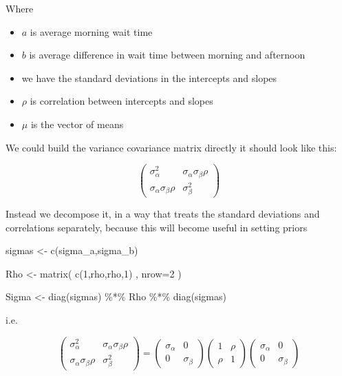 \documentclass[
]{book}
\newenvironment{Shaded}{\begin{snugshade}}{\end{snugshade}}
\newcommand{\AttributeTok}[1]{\textcolor[rgb]{0.77,0.63,0.00}{#1}}
\newcommand{\DecValTok}[1]{\textcolor[rgb]{0.00,0.00,0.81}{#1}}
\newcommand{\FunctionTok}[1]{\textcolor[rgb]{0.00,0.00,0.00}{#1}}
\newcommand{\NormalTok}[1]{#1}
\newcommand{\OtherTok}[1]{\textcolor[rgb]{0.56,0.35,0.01}{#1}}
\newcommand{\SpecialCharTok}[1]{\textcolor[rgb]{0.00,0.00,0.00}{#1}}
\providecommand{\tightlist}{%
  \setlength{\itemsep}{0pt}\setlength{\parskip}{0pt}}
\begin{document}
Where

\begin{itemize}
\tightlist
\item
  \(a\) is average morning wait time
\item
  \(b\) is average difference in wait time between morning and afternoon
\item
  we have the standard deviations in the intercepts and slopes
\item
  \(\rho\) is correlation between intercepts and slopes
\item
  \(\mu\) is the vector of means
\end{itemize}

We could build the variance covariance matrix directly it should look like this:

\[
\begin{pmatrix}
\sigma_\alpha^2 & \sigma_\alpha \sigma_\beta \rho \\
\sigma_\alpha \sigma_\beta \rho & \sigma_\beta^2 
\end{pmatrix}
\]

Instead we decompose it, in a way that treats the standard deviations and correlations separately, because this will become useful in setting priors

\begin{Shaded}
\begin{Highlighting}[]
\NormalTok{sigmas }\OtherTok{\textless{}{-}} \FunctionTok{c}\NormalTok{(sigma\_a,sigma\_b)  }

\NormalTok{Rho }\OtherTok{\textless{}{-}} \FunctionTok{matrix}\NormalTok{( }\FunctionTok{c}\NormalTok{(}\DecValTok{1}\NormalTok{,rho,rho,}\DecValTok{1}\NormalTok{) , }\AttributeTok{nrow=}\DecValTok{2}\NormalTok{ ) }

\NormalTok{Sigma }\OtherTok{\textless{}{-}} \FunctionTok{diag}\NormalTok{(sigmas) }\SpecialCharTok{\%*\%}\NormalTok{ Rho }\SpecialCharTok{\%*\%} \FunctionTok{diag}\NormalTok{(sigmas)}
\end{Highlighting}
\end{Shaded}

i.e.

\[
\begin{pmatrix}
\sigma_\alpha^2 & \sigma_\alpha \sigma_\beta \rho \\
\sigma_\alpha \sigma_\beta \rho & \sigma_\beta^2 
\end{pmatrix}
=
\begin{pmatrix}
\sigma_\alpha & 0 \\
0 & \sigma_\beta 
\end{pmatrix}
\begin{pmatrix}
1 &  \rho \\
 \rho & 1 
\end{pmatrix}
\begin{pmatrix}
\sigma_\alpha & 0 \\
0 & \sigma_\beta 
\end{pmatrix}
\]
\end{document}
